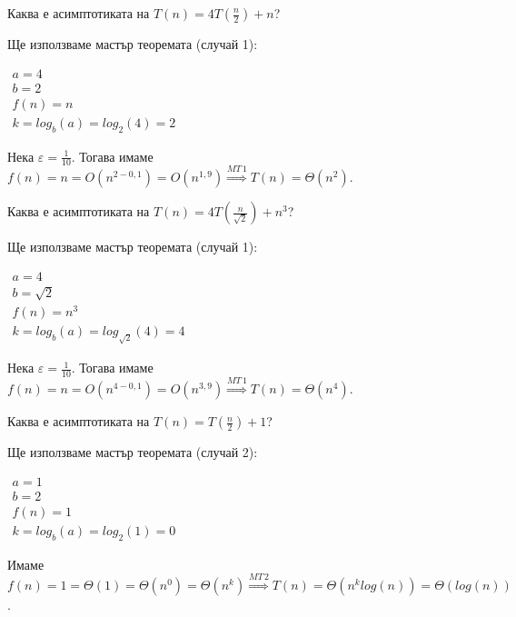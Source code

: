 \begin{problem}
	Каква е асимптотиката на $T(n)=4T(\frac n2)+n$?
\end{problem}

\begin{solution}
	Ще използваме $\hyperref[th:master-theorem]{\text{мастър теоремата}}$ (случай 1):
	\begin{center}
		$\begin{array}{|l}
			a=4\\
			b=2\\
			f(n)=n\\
			k=log_b(a)=log_2(4)=2
		\end{array}$
	\end{center}
	Нека $\varepsilon=\frac1{10}$. Тогава имаме $f(n)=n=O(n^{2-0,1})=O(n^{1,9})\overset{MT\,1}{\Longrightarrow}T(n)=\Theta(n^2)$.
\end{solution}\leavevmode\newline

\begin{problem}
	Каква е асимптотиката на $T(n)=4T(\frac n{\sqrt2})+n^3$?
\end{problem}

\begin{solution}
	Ще използваме $\hyperref[th:master-theorem]{\text{мастър теоремата}}$ (случай 1):
	\begin{center}
		$\begin{array}{|l}
			a=4\\
			b=\sqrt2\\
			f(n)=n^3\\
			k=log_b(a)=log_{\sqrt2}(4)=4
		\end{array}$
	\end{center}
	Нека $\varepsilon=\frac1{10}$. Тогава имаме $f(n)=n=O(n^{4-0,1})=O(n^{3,9})\overset{MT\,1}{\Longrightarrow}T(n)=\Theta(n^4)$.
\end{solution}\leavevmode\newline

\begin{problem}
	Каква е асимптотиката на $T(n)=T(\frac n2)+1$?
\end{problem}

\begin{solution}
	Ще използваме $\hyperref[th:master-theorem]{\text{мастър теоремата}}$ (случай 2):
	\begin{center}
		$\begin{array}{|l}
			a=1\\
			b=2\\
			f(n)=1\\
			k=log_b(a)=log_2(1)=0
		\end{array}$
	\end{center}
	Имаме $f(n)=1=\Theta(1)=\Theta(n^0)=\Theta(n^k)\overset{MT\,2}{\Longrightarrow}T(n)=\Theta(n^klog(n))=\Theta(log(n))$.
\end{solution}\leavevmode\newline

